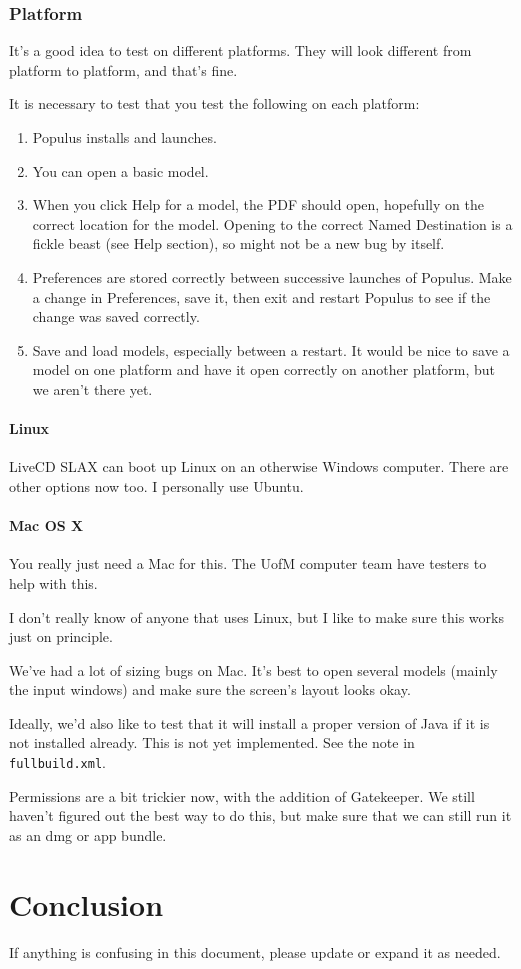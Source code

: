 \documentclass[12pt]{article}
\begin{document}
\section{Platform}
It's a good idea to test on different platforms.  They will look different from platform to platform, and that's fine.

It is necessary to test that you test the following on each platform:

\begin{enumerate}
	\item Populus installs and launches.
	\item You can open a basic model.
	\item When you click Help for a model, the PDF should open, hopefully on the correct location for the model.  Opening to the correct Named Destination is a fickle beast (see Help section), so might not be a new bug by itself.
	\item Preferences are stored correctly between successive launches of Populus.  Make a change in Preferences, save it, then exit and restart Populus to see if the change was saved correctly.
	\item Save and load models, especially between a restart.  It would be nice to save a model on one platform and have it open correctly on another platform, but we aren't there yet.
\end{enumerate}


\subsection{Linux}
LiveCD SLAX can boot up Linux on an otherwise Windows computer.  There are other options now too.  I personally use Ubuntu.
\subsection{Mac OS X}
You really just need a Mac for this.  The UofM computer team have testers to help with this.

I don't really know of anyone that uses Linux, but I like to make sure this works just on principle.

We've had a lot of sizing bugs on Mac.  It's best to open several models (mainly the input windows) and make sure the screen's layout looks okay.

Ideally, we'd also like to test that it will install a proper version of Java if it is not installed already.  This is not yet implemented.  See the note in \texttt{fullbuild.xml}.

Permissions are a bit trickier now, with the addition of Gatekeeper.  We still haven't figured out the best way to do this, but make sure that we can still run it as an dmg or app bundle. 

\part{Conclusion}
If anything is confusing in this document, please update or expand it as needed.
\end{document}
